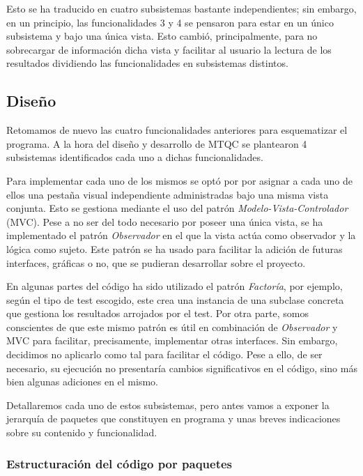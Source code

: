Esto se ha traducido en cuatro subsistemas bastante independientes; sin embargo, en un principio, las funcionalidades 3 y 4 se pensaron para estar en un único subsistema y bajo una única vista. Esto cambió, principalmente, para no sobrecargar de información dicha vista y facilitar al usuario la lectura de los resultados dividiendo las funcionalidades en subsistemas distintos.

\subsection{Diseño}

Retomamos de nuevo las cuatro funcionalidades anteriores para esquematizar el programa. A la hora del diseño y desarrollo de MTQC se plantearon 4 subsistemas identificados cada uno a dichas funcionalidades.

Para implementar cada uno de los mismos se optó por por asignar a cada uno de ellos una pestaña visual independiente administradas bajo una misma vista conjunta. Esto se gestiona mediante el uso del patrón \textit{Modelo-Vista-Controlador} (MVC). Pese a no ser del todo necesario por poseer una única vista, se ha implementado el patrón \textit{Observador} en el que la vista actúa como observador y la lógica como sujeto. Este patrón se ha usado para facilitar la adición de futuras interfaces, gráficas o no, que se pudieran desarrollar sobre el proyecto.

En algunas partes del código ha sido utilizado el patrón \textit{Factoría}, por ejemplo, según el tipo de test escogido, este crea una instancia de una subclase concreta que gestiona los resultados arrojados por el test. Por otra parte, somos conscientes de que este mismo patrón es útil en combinación de \textit{Observador} y MVC para facilitar, precisamente, implementar otras interfaces. Sin embargo, decidimos no aplicarlo como tal para facilitar el código. Pese a ello, de ser necesario, su ejecución no presentaría cambios significativos en el código, sino más bien algunas adiciones en el mismo.

Detallaremos cada uno de estos subsistemas, pero antes vamos a exponer la jerarquía de paquetes que constituyen en programa y unas breves indicaciones sobre su contenido y funcionalidad.

\subsubsection{Estructuración del código por paquetes}

